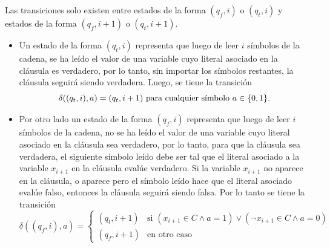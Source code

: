 Las transiciones solo existen entre estados de la forma $(q_f, i)$ o $(q_t, i)$ y estados de la forma $(q_f, i+1)$ o $(q_t, i+1)$.

\begin{itemize}
    \item Un estado de la forma $(q_t, i)$ representa que luego de leer $i$ símbolos de la cadena, se ha leído el valor de una variable cuyo literal asociado en la cláusula es verdadero, por lo tanto, sin importar los símbolos restantes, la cláusula seguirá siendo verdadera. Luego, se tiene la transición
          $$
              \delta((q_t, i), a) = (q_t, i+1) \text{ para cualquier símbolo } a \in \{0, 1\}.
          $$
    \item Por otro lado un estado de la forma $(q_f, i)$ representa que luego de leer $i$ símbolos de la cadena, no se ha leído el valor de una variable cuyo literal asociado en la cláusula sea verdadero, por lo tanto, para que la cláusula sea verdadera, el siguiente símbolo leído debe ser tal que el literal asociado a la variable $x_{i+1}$ en la cláusula evalúe verdadero. Si la variable $x_{i+1}$ no aparece en la cláusula, o aparece pero el símbolo leído hace que el literal asociado evalúe falso, entonces la cláusula seguirá siendo falsa. Por lo tanto se tiene la transición
          $$
              \delta((q_f, i), a) = \begin{cases}
                  (q_t, i+1) & \text{si } (x_{i+1} \in C \land a = 1) \lor (\neg x_{i+1} \in C \land a = 0) \\
                  (q_f, i+1) & \text{en otro caso}
              \end{cases}
          $$
\end{itemize}



